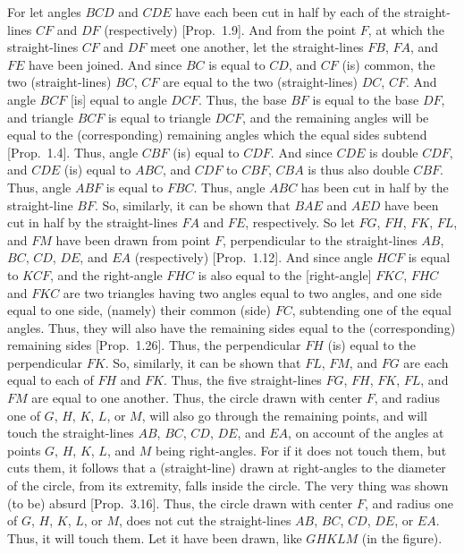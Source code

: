 For let angles $BCD$ and $CDE$ have each been cut in half by each
of the straight-lines $CF$ and $DF$ (respectively) [Prop.~1.9]. And from the point $F$, at which the
straight-lines $CF$ and $DF$ meet one another, let the straight-lines
$FB$, $FA$, and $FE$ have been joined. And since $BC$ is equal to $CD$,
and $CF$ (is) common, the two (straight-lines) $BC$, $CF$ 
are equal to the two (straight-lines) $DC$, $CF$. And angle $BCF$ [is]
equal to angle $DCF$. Thus, the base $BF$ is equal to the base $DF$,
and triangle $BCF$ is equal to triangle $DCF$, and the remaining angles
will be equal to the (corresponding) remaining angles which the
equal sides subtend
[Prop.~1.4]. Thus, angle $CBF$ (is) equal
to $CDF$. And since $CDE$ is double $CDF$, and $CDE$ (is) equal to $ABC$,
and $CDF$ to $CBF$, $CBA$ is thus also double $CBF$. Thus, angle $ABF$
is equal to $FBC$. Thus, angle $ABC$ has been cut in half by the straight-line
$BF$. So, similarly, it can be shown that $BAE$ and $AED$ have 
been cut in half by the straight-lines $FA$ and $FE$, respectively.
So let $FG$, $FH$, $FK$, $FL$, and $FM$ have been drawn from point $F$,
perpendicular to the straight-lines $AB$, $BC$, $CD$, $DE$, and $EA$ 
(respectively)
[Prop.~1.12]. And since angle
$HCF$ is equal to $KCF$, and the right-angle $FHC$ is also equal to
the [right-angle] $FKC$, $FHC$ and $FKC$ are two triangles having two
angles equal to two angles, and one side equal to one side, (namely)
their common (side) $FC$, subtending one of the equal angles. 
Thus, they will also have the remaining sides equal to the (corresponding)
remaining sides [Prop.~1.26].
Thus, the perpendicular $FH$ (is) equal to the perpendicular $FK$. So,
similarly, it can be shown that $FL$, $FM$, and $FG$ are each equal to
each  of $FH$ and $FK$. Thus, the five straight-lines $FG$, $FH$, $FK$, $FL$,
and $FM$ are equal to one another.
Thus, the circle drawn with center $F$, and
radius one of $G$, $H$, $K$, $L$, or $M$, will also go through the remaining
points, and will touch the straight-lines $AB$, $BC$, $CD$, $DE$, and $EA$,
on account of the angles at points $G$, $H$, $K$, $L$, and $M$ being
right-angles. For if it does not touch them, but cuts them, 
 it follows that a (straight-line) drawn at right-angles to the diameter
 of the circle, from its extremity, falls inside the circle.
 The very thing was shown (to be) absurd [Prop.~3.16]. Thus, the circle drawn
 with center $F$, and radius one of $G$, $H$, $K$, $L$,  or $M$, does not
 cut the straight-lines $AB$, $BC$, $CD$, $DE$, or $EA$. Thus, it will
 touch them. Let it have been drawn, like $GHKLM$ (in the figure).
 
